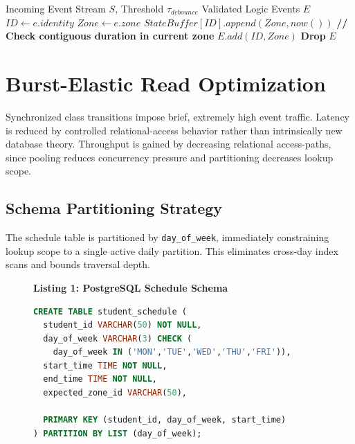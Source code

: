 \documentclass[conference]{IEEEtran}
\begin{document}
\begin{algorithm}[htbp] %
\caption{Temporal Debounce Filtering (PCVF)}
\begin{algorithmic}[1]
\Require Incoming Event Stream $S$, Threshold $\tau_{debounce}$
\Ensure Validated Logic Events $E$
    \State $ID \leftarrow e.identity$
    \State $Zone \leftarrow e.zone$
    \State $StateBuffer[ID].append(Zone, now())$
    \State \textbf{// Check contiguous duration in current zone}
        \State $E.add(ID, Zone)$ 
    \Else
        \State \textbf{Drop} 
    \EndIf
\EndFor
\State \Return $E$
\end{algorithmic}
\label{alg:sanitization}
\end{algorithm}

\section{Burst-Elastic Read Optimization}

Synchronized class transitions impose brief, extremely high event traffic. Latency is reduced by controlled relational-access behavior rather than intrinsically new database theory. Throughput is gained by decreasing relational access-paths, since pooling reduces concurrency pressure and partitioning decreases lookup scope.

\subsection{Schema Partitioning Strategy}

The schedule table is partitioned by \texttt{day\_of\_week}, immediately constraining lookup scope to a single active daily partition. This eliminates cross-day index scans and bounds traversal depth.

\begin{figure}[htbp]
\centering
\textbf{Listing 1: PostgreSQL Schedule Schema}
\begin{lstlisting}[language=SQL]
CREATE TABLE student_schedule (
  student_id VARCHAR(50) NOT NULL,
  day_of_week VARCHAR(3) CHECK (
    day_of_week IN ('MON','TUE','WED','THU','FRI')),
  start_time TIME NOT NULL,
  end_time TIME NOT NULL,
  expected_zone_id VARCHAR(50),
    
  PRIMARY KEY (student_id, day_of_week, start_time)
) PARTITION BY LIST (day_of_week);
\end{lstlisting}
\label{code:sql}
\end{figure}
\end{document}
